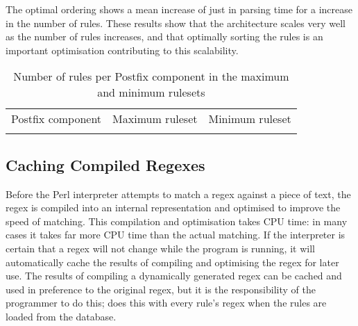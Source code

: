 The optimal ordering shows a mean increase of just
 in parsing time
for a \numberOFrulesMAXIMUMpercentage{} increase in the number of rules.
These results show that the architecture scales very well as the number of
rules increases, and that optimally sorting the rules is an important
optimisation contributing to this scalability.



\begin{table}[thbp]
    \caption{Number of rules per Postfix component in the maximum and
    minimum rulesets}
    \empty{}\label{Number of rules per Postfix component in the maximum and
    minimum rulesets}
    \centering{}
    \begin{tabular}{lrr}
        \tabletopline{}%
        Postfix component & Maximum ruleset & Minimum ruleset \\
        \tablemiddleline{}%
        
        \tablebottomline{}%
    \end{tabular}
\end{table}

\FloatBarrier{}

\subsection{Caching Compiled Regexes}

\label{Caching compiled regexes}

Before the Perl interpreter attempts to match a regex against a piece of
text, the regex is compiled into an internal representation and optimised
to improve the speed of matching.  This compilation and optimisation takes
CPU time: in many cases it takes far more CPU time than the actual
matching.  If the interpreter is certain that a regex will not change while
the program is running, it will automatically cache the results of
compiling and optimising the regex for later use.  The results of compiling
a dynamically generated regex can be cached and used in preference to the
original regex, but it is the responsibility of the programmer to do this;
\parsername{} does this with every rule's regex when the rules are loaded
from the database.

